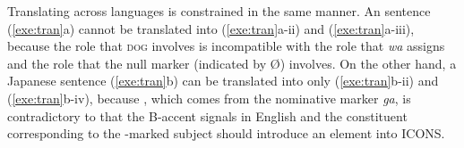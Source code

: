 

Translating across languages is constrained in the same manner. An
 sentence (\ref{exe:tran}a) cannot be translated into
(\ref{exe:tran}a-ii) and (\ref{exe:tran}a-iii), because the
 role that \textsc{dog} involves is incompatible
with the  role that \textit{wa} assigns and the
 role that the null marker (indicated by {\O})
involves. On the other hand, a Japanese sentence (\ref{exe:tran}b) can
be translated into only (\ref{exe:tran}b-ii) and (\ref{exe:tran}b-iv),
because , which comes from the nominative marker
\textit{ga}, is contradictory to  that the
B-accent signals in English and the constituent corresponding to the
\ga-marked subject should introduce an  element into
ICONS.







